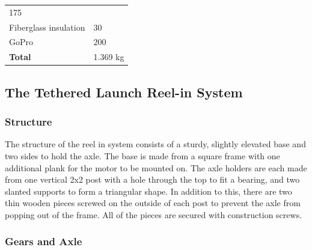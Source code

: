 \documentclass[12pt,]{article}
\begin{document}
\begin{longtable}[]{@{}ll@{}}
\begin{minipage}[t]{0.22\columnwidth}
175\strut
\end{minipage}\tabularnewline
\begin{minipage}[t]{0.72\columnwidth}\raggedright\strut
Fiberglass insulation\strut
\end{minipage} & \begin{minipage}[t]{0.22\columnwidth}\raggedright\strut
30\strut
\end{minipage}\tabularnewline
\begin{minipage}[t]{0.72\columnwidth}\raggedright\strut
GoPro\strut
\end{minipage} & \begin{minipage}[t]{0.22\columnwidth}\raggedright\strut
200\strut
\end{minipage}\tabularnewline
\begin{minipage}[t]{0.72\columnwidth}\raggedright\strut
\textbf{Total}\strut
\end{minipage} & \begin{minipage}[t]{0.22\columnwidth}\raggedright\strut
1.369 kg\strut
\end{minipage}\tabularnewline
\bottomrule
\end{longtable}

\subsection{The Tethered Launch Reel-in
System}\label{the-tethered-launch-reel-in-system}

\subsubsection{Structure}\label{structure-1}

The structure of the reel in system consists of a sturdy, slightly
elevated base and two sides to hold the axle. The base is made from a
square frame with one additional plank for the motor to be mounted on.
The axle holders are each made from one vertical 2x2 post with a hole
through the top to fit a bearing, and two slanted supports to form a
triangular shape. In addition to this, there are two thin wooden pieces
screwed on the outside of each post to prevent the axle from popping out
of the frame. All of the pieces are secured with construction screws.

\subsubsection{Gears and Axle}\label{gears-and-axle}
\end{document}
